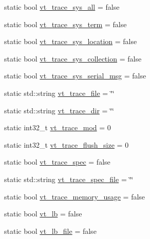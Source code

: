 \begin{DoxyCompactItemize}
\item 
static bool \hyperlink{structvt_1_1arguments_1_1_arg_config_a0f29a730468e776a3281e5cb2694395c}{vt\+\_\+trace\+\_\+sys\+\_\+all} = false
\item 
static bool \hyperlink{structvt_1_1arguments_1_1_arg_config_a3618f4c676020355d57dd29623959224}{vt\+\_\+trace\+\_\+sys\+\_\+term} = false
\item 
static bool \hyperlink{structvt_1_1arguments_1_1_arg_config_ad810a33c24ce08006af0bafeffce9ec8}{vt\+\_\+trace\+\_\+sys\+\_\+location} = false
\item 
static bool \hyperlink{structvt_1_1arguments_1_1_arg_config_ac4afb6f023f686f3ed1643394d3ea80c}{vt\+\_\+trace\+\_\+sys\+\_\+collection} = false
\item 
static bool \hyperlink{structvt_1_1arguments_1_1_arg_config_a44627a2ab6723ed7646511a12124325e}{vt\+\_\+trace\+\_\+sys\+\_\+serial\+\_\+msg} = false
\item 
static std\+::string \hyperlink{structvt_1_1arguments_1_1_arg_config_a296fe4ab5d11f984532b780ffcf74657}{vt\+\_\+trace\+\_\+file} = \char`\"{}\char`\"{}
\item 
static std\+::string \hyperlink{structvt_1_1arguments_1_1_arg_config_aa30e39d83c2391ff918f86f8d5009b3f}{vt\+\_\+trace\+\_\+dir} = \char`\"{}\char`\"{}
\item 
static int32\+\_\+t \hyperlink{structvt_1_1arguments_1_1_arg_config_acb14bb6b6f58db2a35bc71a4c6c06799}{vt\+\_\+trace\+\_\+mod} = 0
\item 
static int32\+\_\+t \hyperlink{structvt_1_1arguments_1_1_arg_config_a8f122ed882f2de1f03091edbe64f1f2b}{vt\+\_\+trace\+\_\+flush\+\_\+size} = 0
\item 
static bool \hyperlink{structvt_1_1arguments_1_1_arg_config_a5985e792d6c3810293b54dda059460bd}{vt\+\_\+trace\+\_\+spec} = false
\item 
static std\+::string \hyperlink{structvt_1_1arguments_1_1_arg_config_a0369ed37706b8e7d563cd8f25763a56c}{vt\+\_\+trace\+\_\+spec\+\_\+file} = \char`\"{}\char`\"{}
\item 
static bool \hyperlink{structvt_1_1arguments_1_1_arg_config_aa4ca0b4d3eedbe726b0c50d178dfb3bf}{vt\+\_\+trace\+\_\+memory\+\_\+usage} = false
\item 
static bool \hyperlink{structvt_1_1arguments_1_1_arg_config_aab51ec67928526875a458f982e5fa90c}{vt\+\_\+lb} = false
\item 
static bool \hyperlink{structvt_1_1arguments_1_1_arg_config_a970d5784bfb69a34a04ec393fcd41cf6}{vt\+\_\+lb\+\_\+file} = false

\end{DoxyCompactItemize}

